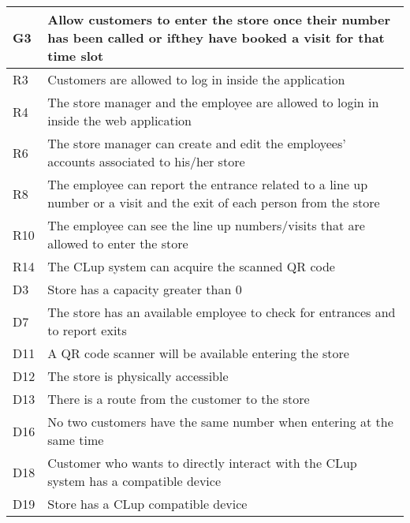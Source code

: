 \begin{center}
    {\renewcommand{\arraystretch}{1.5}
    \begin{longtable}{L{2cm}L{12cm}}
        \hline
        \textbf{G3} & \textbf{Allow customers to enter the store once their number has been called or ifthey have booked a visit for that time slot} \\
        \hline
         R3 & Customers are allowed to log in inside the application \\
        \hline
         R4 & The store manager and the employee are allowed to login in inside the web application \\
        \hline
         R6 & The store manager can create and edit the employees’ accounts associated to his/her store \\
        \hline
         R8 & The employee can report the entrance related to a line up number or a visit and the exit of each person from the store \\
        \hline
         R10 & The employee can see the line up numbers/visits that are allowed to enter the store \\
        \hline
         R14 & The CLup system can acquire the scanned QR code \\
        \hline
         D3 & Store has a capacity greater than 0 \\
        \hline
         D7 & The store has an available employee to check for entrances and to report exits \\
        \hline
         D11 & A QR code scanner will be available entering the store \\
        \hline
         D12 & The store is physically accessible \\
        \hline
         D13 & There is a route from the customer to the store \\
        \hline
         D16 & No two customers have the same number when entering at the same time \\
        \hline
         D18 & Customer who wants to directly interact with the CLup system has a compatible device \\
        \hline
         D19 & Store has a CLup compatible device \\
        \hline
    \end{longtable}}


\end{center}
